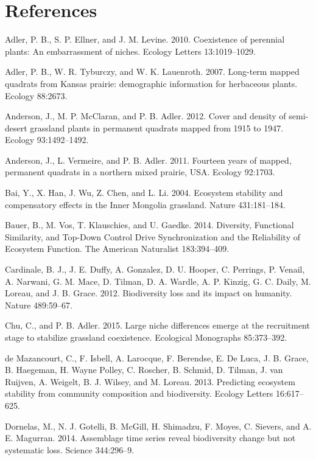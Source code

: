 \documentclass[12pt,]{article}
\begin{document}
\setlength{\parindent}{0ex} 

\section{References}\label{references}

Adler, P. B., S. P. Ellner, and J. M. Levine. 2010. Coexistence of
perennial plants: An embarrassment of niches. Ecology Letters
13:1019--1029.

Adler, P. B., W. R. Tyburczy, and W. K. Lauenroth. 2007. Long-term
mapped quadrats from Kansas prairie: demographic information for
herbaceous plants. Ecology 88:2673.

Anderson, J., M. P. McClaran, and P. B. Adler. 2012. Cover and density
of semi-desert grassland plants in permanent quadrats mapped from 1915
to 1947. Ecology 93:1492--1492.

Anderson, J., L. Vermeire, and P. B. Adler. 2011. Fourteen years of
mapped, permanent quadrats in a northern mixed prairie, USA. Ecology
92:1703.

Bai, Y., X. Han, J. Wu, Z. Chen, and L. Li. 2004. Ecosystem stability
and compensatory effects in the Inner Mongolia grassland. Nature
431:181--184.

Bauer, B., M. Vos, T. Klauschies, and U. Gaedke. 2014. Diversity,
Functional Similarity, and Top-Down Control Drive Synchronization and
the Reliability of Ecosystem Function. The American Naturalist
183:394--409.

Cardinale, B. J., J. E. Duffy, A. Gonzalez, D. U. Hooper, C. Perrings,
P. Venail, A. Narwani, G. M. Mace, D. Tilman, D. A. Wardle, A. P.
Kinzig, G. C. Daily, M. Loreau, and J. B. Grace. 2012. Biodiversity loss
and its impact on humanity. Nature 489:59--67.

Chu, C., and P. B. Adler. 2015. Large niche differences emerge at the
recruitment stage to stabilize grassland coexistence. Ecological
Monographs 85:373--392.

{{de Mazancourt}}, C., F. Isbell, A. Larocque, F. Berendse, E. {De
Luca}, J. B. Grace, B. Haegeman, H. {Wayne Polley}, C. Roscher, B.
Schmid, D. Tilman, J. van Ruijven, A. Weigelt, B. J. Wilsey, and M.
Loreau. 2013. Predicting ecosystem stability from community composition
and biodiversity. Ecology Letters 16:617--625.

Dornelas, M., N. J. Gotelli, B. McGill, H. Shimadzu, F. Moyes, C.
Sievers, and A. E. Magurran. 2014. Assemblage time series reveal
biodiversity change but not systematic loss. Science 344:296--9.
\end{document}
